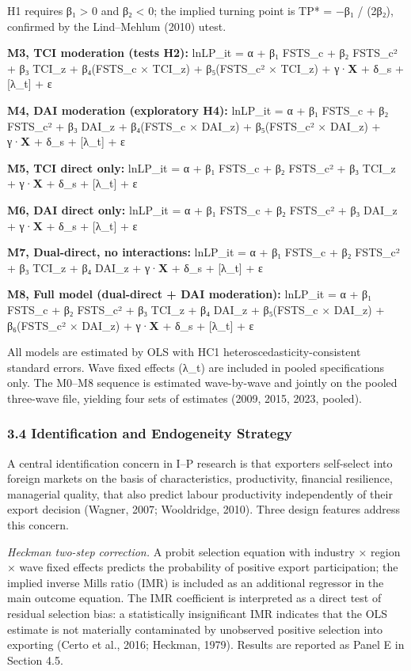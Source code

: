 \documentclass[12pt,a4paper]{article}
\begin{document}
H1 requires β₁ \textgreater{} 0 and β₂ \textless{} 0; the implied
turning point is TP* = −β₁ / (2β₂), confirmed by the Lind--Mehlum (2010)
utest.

\textbf{M3, TCI moderation (tests H2):} lnLP\_it = α + β₁ FSTS\_c + β₂
FSTS\_c² + β₃ TCI\_z + β₄(FSTS\_c × TCI\_z) + β₅(FSTS\_c² × TCI\_z) +
γ·\textbf{X} + δ\_s + {[}λ\_t{]} + ε

\textbf{M4, DAI moderation (exploratory H4):} lnLP\_it = α + β₁ FSTS\_c
+ β₂ FSTS\_c² + β₃ DAI\_z + β₄(FSTS\_c × DAI\_z) + β₅(FSTS\_c² × DAI\_z)
+ γ·\textbf{X} + δ\_s + {[}λ\_t{]} + ε

\textbf{M5, TCI direct only:} lnLP\_it = α + β₁ FSTS\_c + β₂ FSTS\_c² +
β₃ TCI\_z + γ·\textbf{X} + δ\_s + {[}λ\_t{]} + ε

\textbf{M6, DAI direct only:} lnLP\_it = α + β₁ FSTS\_c + β₂ FSTS\_c² +
β₃ DAI\_z + γ·\textbf{X} + δ\_s + {[}λ\_t{]} + ε

\textbf{M7, Dual-direct, no interactions:} lnLP\_it = α + β₁ FSTS\_c +
β₂ FSTS\_c² + β₃ TCI\_z + β₄ DAI\_z + γ·\textbf{X} + δ\_s + {[}λ\_t{]} +
ε

\textbf{M8, Full model (dual-direct + DAI moderation):} lnLP\_it = α +
β₁ FSTS\_c + β₂ FSTS\_c² + β₃ TCI\_z + β₄ DAI\_z + β₅(FSTS\_c × DAI\_z)
+ β₆(FSTS\_c² × DAI\_z) + γ·\textbf{X} + δ\_s + {[}λ\_t{]} + ε

All models are estimated by OLS with HC1 heteroscedasticity-consistent
standard errors. Wave fixed effects (λ\_t) are included in pooled
specifications only. The M0--M8 sequence is estimated wave-by-wave and
jointly on the pooled three-wave file, yielding four sets of estimates
(2009, 2015, 2023, pooled).

\hypertarget{34-identification-and-endogeneity-strategy}{%
\subsubsection{3.4 Identification and Endogeneity
Strategy}\label{34-identification-and-endogeneity-strategy}}

A central identification concern in I--P research is that exporters
self-select into foreign markets on the basis of characteristics,
productivity, financial resilience, managerial quality, that also
predict labour productivity independently of their export decision
(Wagner, 2007; Wooldridge, 2010). Three design features address this
concern.

\emph{Heckman two-step correction.} A probit selection equation with
industry × region × wave fixed effects predicts the probability of
positive export participation; the implied inverse Mills ratio (IMR) is
included as an additional regressor in the main outcome equation. The
IMR coefficient is interpreted as a direct test of residual selection
bias: a statistically insignificant IMR indicates that the OLS estimate
is not materially contaminated by unobserved positive selection into
exporting (Certo et al., 2016; Heckman, 1979). Results are reported as
Panel E in Section 4.5.
\end{document}
